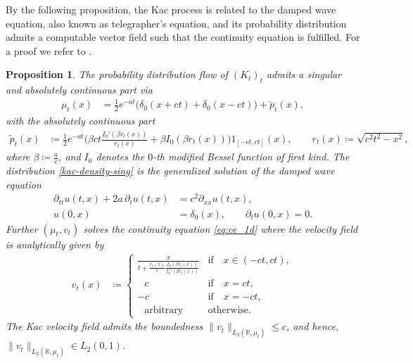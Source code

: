 \documentclass{article}
\newcommand{\R}{\mathbb{R}}
\theoremstyle{plain}
\newtheorem{proposition}[theorem]{Proposition}
\theoremstyle{definition}
\theoremstyle{remark}
\begin{document}
By the following proposition, the Kac process is related to the
damped wave equation, also known as telegrapher's equation, and its
probability distribution admits a computable vector field such that the continuity equation is fulfilled. For a proof we refer to \cite{DCFS2025}. 


\begin{proposition}
The probability distribution flow of $(K_t)_t$ admits a singular and absolutely continuous part via
\begin{align}\label{kac-density-sing}
       \mu_t(x) &= \frac12 e^{-at} \big( \delta_0(x+ct) + \delta_0(x-ct)  \big) + \tilde p_t(x),
   \end{align}
   with the absolutely continuous part
   \begin{align} \label{kac-density-cont}
     \tilde p_t(x) &\coloneqq \frac12 e^{-at} \Big(\beta ct \frac{I_0'(\beta r_t(x))}{r_t(x)}  
     + \beta I_0(\beta r_t(x))
     \Big) {1}_{[-ct,ct]}(x), \qquad r_t(x) \coloneqq \sqrt{c^2t^2-x^2},
   \end{align}
where $\beta \coloneqq \frac{a}{c}$, and $I_0$ denotes the $0$-th \emph{modified Bessel function of first kind}. The distribution \eqref{kac-density-sing} is the generalized solution of the damped wave equation
\begin{align}\label{tele-eq-1D}
    \partial_{tt} u(t,x) + 2a \, \partial_{t} u(t,x) &= c^2 \partial_{xx} u(t,x), \\
    u(0,x) &= \delta_0(x), \qquad
    \partial_t u(0,x) = 0.
\end{align}  
Further $(\mu_t,v_t)$ solves the continuity equation \eqref{eq:ce_1d} where the velocity field is analytically given by
\begin{align} \label{kac-velo}
       v_t(x) &\coloneqq 
       \left\{
       \begin{array}{cl}
           \frac{x}{
           t +  \frac{r_t(x)}{c} \frac{I_0(\beta r_t(x))}{ I_0'(\beta r_t(x))} }
           & \text{if} \quad x \in (-ct, ct),\\
           \; \; \, c &\text{if} \quad x=ct, \\
           -c & \text{if} \quad x=-ct,\\
            \; \; \, \text{arbitrary} & \text{otherwise}.
       \end{array}
       \right.
   \end{align}
   The Kac velocity field admits the boundedness $\|v_t\|_{L_2(\R,\mu_t)} \le c$, and hence, $\|v_t\|_{L_2(\R,\mu_t)} \in L_2(0,1)$.
\end{proposition}
\end{document}
